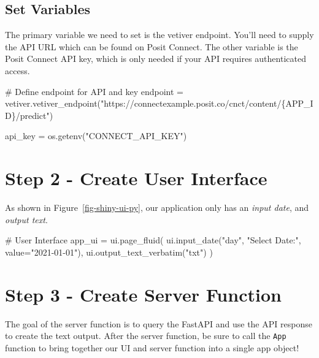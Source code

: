 \documentclass[
  letterpaper,
  DIV=11,
  numbers=noendperiod]{scrreprt}
\newenvironment{Shaded}{\begin{snugshade}}{\end{snugshade}}
\newcommand{\CommentTok}[1]{\textcolor[rgb]{0.37,0.37,0.37}{#1}}
\newcommand{\NormalTok}[1]{\textcolor[rgb]{0.00,0.23,0.31}{#1}}
\newcommand{\OperatorTok}[1]{\textcolor[rgb]{0.37,0.37,0.37}{#1}}
\newcommand{\SpecialCharTok}[1]{\textcolor[rgb]{0.37,0.37,0.37}{#1}}
\newcommand{\StringTok}[1]{\textcolor[rgb]{0.13,0.47,0.30}{#1}}
\begin{document}
\subsection{Set Variables}\label{set-variables}

The primary variable we need to set is the vetiver endpoint. You'll need
to supply the API URL which can be found on Posit Connect. The other
variable is the Posit Connect API key, which is only needed if your API
requires authenticated access.

\begin{Shaded}
\begin{Highlighting}[]
\CommentTok{\# Define endpoint for API and key}
\NormalTok{endpoint }\OperatorTok{=}\NormalTok{ vetiver.vetiver\_endpoint(}\StringTok{"https://connectexample.posit.co/cnct/content/}\SpecialCharTok{\{APP\_ID\}}\StringTok{/predict"}\NormalTok{)}

\NormalTok{api\_key }\OperatorTok{=}\NormalTok{ os.getenv(}\StringTok{"CONNECT\_API\_KEY"}\NormalTok{) }
\end{Highlighting}
\end{Shaded}

\section{Step 2 - Create User
Interface}\label{step-2---create-user-interface}

As shown in Figure~\ref{fig-shiny-ui-py}, our application only has an
\emph{input date}, and \emph{output text}.

\begin{Shaded}
\begin{Highlighting}[]
\CommentTok{\# User Interface}
\NormalTok{app\_ui }\OperatorTok{=}\NormalTok{ ui.page\_fluid(}
\NormalTok{    ui.input\_date(}\StringTok{"day"}\NormalTok{, }\StringTok{"Select Date:"}\NormalTok{, value}\OperatorTok{=}\StringTok{"2021{-}01{-}01"}\NormalTok{),}
\NormalTok{    ui.output\_text\_verbatim(}\StringTok{"txt"}\NormalTok{)}
\NormalTok{)}
\end{Highlighting}
\end{Shaded}

\section{Step 3 - Create Server
Function}\label{step-3---create-server-function}

The goal of the server function is to query the FastAPI and use the API
response to create the text output. After the server function, be sure
to call the \texttt{App} function to bring together our UI and server
function into a single app object!
\end{document}

